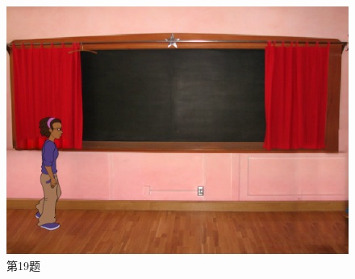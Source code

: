 \documentclass[10pt, a4paper]{article}
\begin{document}
\begin{enumerate}
\begin{figure}[htbp]
\begin{minipage}[t]{.58\textwidth}
\begin{minipage}[t]{.2\textwidth}
                \end{minipage}
                \begin{minipage}[t]{.48\textwidth}
                    \centering
                    \includegraphics[width=\textwidth]{19-3.png}
                \end{minipage}
                \caption*{第19题}
            \end{minipage}
            \begin{minipage}[t]{.1\textwidth}
                \centering

\end{minipage}
\end{figure}
\end{enumerate}
\end{document}
